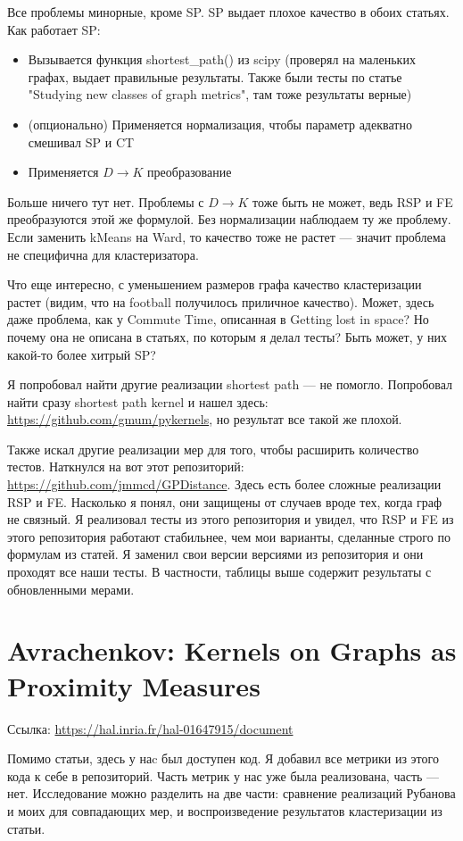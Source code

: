 \documentclass{article}
\begin{document}
Все проблемы минорные, кроме SP. SP выдает плохое качество в обоих статьях.
Как работает SP:
\begin{itemize}
  \item Вызывается функция shortest\_path() из scipy (проверял на маленьких графах, выдает правильные результаты. Также были тесты по статье "Studying new classes of graph metrics", там тоже результаты верные)
  \item (опционально) Применяется нормализация, чтобы параметр адекватно смешивал SP и CT
  \item Применяется $D \rightarrow K$ преобразование
\end{itemize}

Больше ничего тут нет. Проблемы с $D \rightarrow K$ тоже быть не может, ведь RSP и FE преобразуются этой же формулой. Без нормализации наблюдаем ту же проблему. Если заменить kMeans на Ward, то качество тоже не растет --- значит проблема не специфична для кластеризатора.

 Что еще интересно, с уменьшением размеров графа качество кластеризации растет (видим, что на football получилось приличное качество). Может, здесь даже проблема, как у Commute Time, описанная в Getting lost in space? Но почему она не описана в статьях, по которым я делал тесты? Быть может, у них какой-то более хитрый SP?

Я попробовал найти другие реализации shortest path --- не помогло. Попробовал найти сразу shortest path kernel и нашел здесь: \url{https://github.com/gmum/pykernels}, но результат все такой же плохой.

Также искал другие реализации мер для того, чтобы расширить количество тестов. Наткнулся на вот этот репозиторий: \url{https://github.com/jmmcd/GPDistance}. Здесь есть более сложные реализации RSP и FE. Насколько я понял, они защищены от случаев вроде тех, когда граф не связный. Я реализовал тесты из этого репозитория и увидел, что RSP и FE из этого репозитория работают стабильнее, чем мои варианты, сделанные строго по формулам из статей. Я заменил свои версии версиями из репозитория и они проходят все наши тесты. В частности, таблицы выше содержит результаты с обновленными мерами.


\section{Avrachenkov: Kernels on Graphs as Proximity Measures}
Ссылка: \url{https://hal.inria.fr/hal-01647915/document}

Помимо статьи, здесь у наc был доступен код. Я добавил все метрики из этого кода к себе в репозиторий. Часть метрик у нас уже была реализована, часть --- нет.
Исследование можно разделить на две части: сравнение реализаций Рубанова и моих для совпадающих мер, и воспроизведение результатов кластеризации из статьи.
\end{document}
